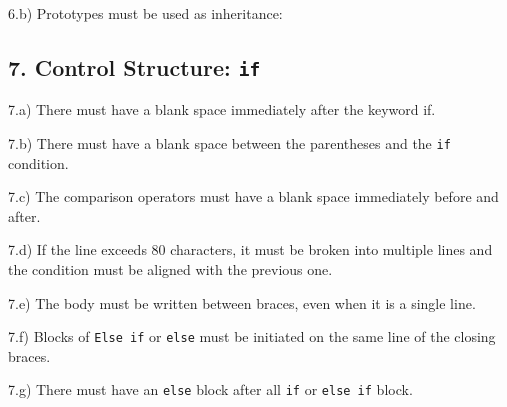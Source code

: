 \documentclass[12pt,openright,a4paper,conference,onecolumn,twoside,english,french,spanish]{IEEEtran}
\begin{document}
6.b) Prototypes must be used as inheritance:

\begin{Shaded}
\begin{Highlighting}[]
 
   
\NormalTok{\}}

 \NormalTok{= } \NormalTok{();}

  \NormalTok{( } \NormalTok{);}
\NormalTok{( } \NormalTok{); }
\end{Highlighting}
\end{Shaded}

\subsection{7. Control Structure:
\texttt{if}}\label{control-structure-if}

7.a) There must have a blank space immediately after the keyword if.

7.b) There must have a blank space between the parentheses and the
\texttt{if} condition.

7.c) The comparison operators must have a blank space immediately before
and after.

7.d) If the line exceeds 80 characters, it must be broken into multiple
lines and the condition must be aligned with the previous one.

7.e) The body must be written between braces, even when it is a single
line.

7.f) Blocks of \texttt{Else if} or \texttt{else} must be initiated on
the same line of the closing braces.

7.g) There must have an \texttt{else} block after all \texttt{if} or
\texttt{else if} block.
\end{document}
